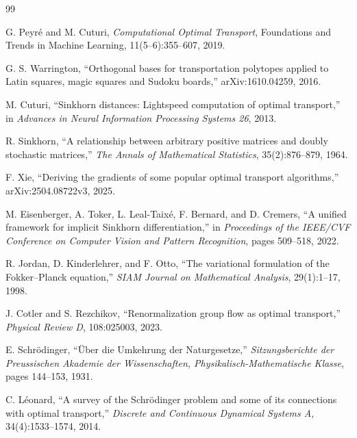 \documentclass[11pt]{article}
\begin{document}
\begin{thebibliography}{99}
\raggedright

G. Peyr\'e and M. Cuturi,
\emph{Computational Optimal Transport},
Foundations and Trends in Machine Learning, 11(5--6):355--607, 2019.

G. S. Warrington,
``Orthogonal bases for transportation polytopes applied to Latin squares,
magic squares and Sudoku boards,''
arXiv:1610.04259, 2016.

M. Cuturi,
``Sinkhorn distances: Lightspeed computation of optimal transport,''
in \emph{Advances in Neural Information Processing Systems 26}, 2013.

R. Sinkhorn,
``A relationship between arbitrary positive matrices and doubly stochastic
matrices,''
\emph{The Annals of Mathematical Statistics}, 35(2):876--879, 1964.

F. Xie,
``Deriving the gradients of some popular optimal transport algorithms,''
arXiv:2504.08722v3, 2025.

M. Eisenberger, A. Toker, L. Leal-Taix\'e, F. Bernard, and D. Cremers,
``A unified framework for implicit Sinkhorn differentiation,''
in \emph{Proceedings of the IEEE/CVF Conference on Computer Vision and
Pattern Recognition}, pages 509--518, 2022.

R. Jordan, D. Kinderlehrer, and F. Otto,
``The variational formulation of the Fokker--Planck equation,''
\emph{SIAM Journal on Mathematical Analysis}, 29(1):1--17, 1998.

J. Cotler and S. Rezchikov,
``Renormalization group flow as optimal transport,''
\emph{Physical Review D}, 108:025003, 2023.

E. Schr\"odinger,
``\"Uber die Umkehrung der Naturgesetze,''
\emph{Sitzungsberichte der Preussischen Akademie der Wissenschaften,
Physikalisch-Mathematische Klasse}, pages 144--153, 1931.

C. L\'eonard,
``A survey of the Schr\"odinger problem and some of its connections with
optimal transport,''
\emph{Discrete and Continuous Dynamical Systems A}, 34(4):1533--1574, 2014.

\end{thebibliography}
\end{document}
